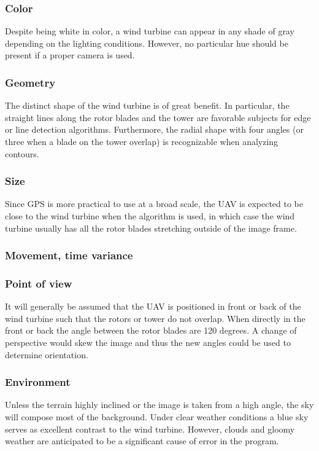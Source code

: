 \documentclass[a4paper,10pt]{article}
\begin{document}
      \subsubsection{Color}
      \label{sec:color}
	Despite being white in color, a wind turbine can appear in any shade of gray depending on the lighting conditions. However, no particular hue should be present if a proper camera is used.
	
      \subsubsection{Geometry}
	The distinct shape of the wind turbine is of great benefit. In particular, the straight lines along the rotor blades and the tower are favorable subjects for edge or line detection algorithms. Furthermore, the radial shape with four angles (or three when a blade on the tower overlap) is recognizable when analyzing contours.
	
      \subsubsection{Size}
	Since GPS is more practical to use at a broad scale, the UAV is expected to be close to the wind turbine when the algorithm is used, in which case the wind turbine usually has all the rotor blades stretching outside of the image frame.
      
      \subsubsection{Movement, time variance}
	
      
      \subsubsection{Point of view}
	It will generally  be assumed that the UAV is positioned in front or back of the wind turbine such that the rotors or tower do not overlap. When directly in the front or back the angle between the rotor blades are 120 degrees. A change of perspective would skew the image and thus the new angles could be used to determine orientation.
      
      \subsubsection{Environment}
	Unless the terrain highly inclined or the image is taken from a high angle, the sky will compose most of the background. Under clear weather conditions a blue sky serves as excellent contrast to the wind turbine. However, clouds and gloomy weather are anticipated to be a significant cause of error in the program.
	
\end{document}
